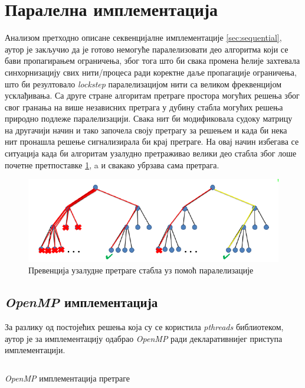 \section{Паралелна имплементација}\label{sec:parallel}

Анализом претходно описане секвенцијалне имплементације \ref{sec:sequential}, аутор је закључио да је готово немогуће паралелизовати део алгоритма који се бави пропагирањем ограничења, због тога што би свака промена ћелије захтевала синхорнизацију свих нити/процеса ради коректне даље пропагације ограничења, што би резултовало \textit{lockstep} паралелизацијом нити са великом фреквенцијом усклађивања. Са друге стране алгоритам претраге простора могућих решења због свог  гранања на више независних претрага у дубину стабла могућих решења природно подлеже паралелизацији. Свака нит би модификовала судоку матрицу на другачији начин и тако започела своју претрагу за решењем и када би нека нит пронашла решење сигнализирала би крај претраге. На овај начин избегава се ситуација када би алгоритам узалудно претраживао велики део стабла због лоше почетне претпоставке \ref{fig:search_parallel}, a и свакако убрзава сама претрага.

\begin{figure}[H]
    \centering
    \includegraphics[width=1\textwidth]{images/search_parallel.png}
    \caption{Превенција узалудне претраге стабла уз помоћ паралелизације}
    \label{fig:search_parallel}
\end{figure}

\subsection{\textit{OpenMP} имплементација}\label{sec:mp_impl}

За разлику од постојећих решења која су се користила \textit{pthreads} \cite{pthreads} библиотеком, аутор је за имплементацију одабрао \textit{OpenMP} \cite{open_mp} ради декларативнијег приступа имплементацији.


\begin{listing}[H]
\inputminted{c}{kodovi/mp_search.c}
\caption{\textit{OpenMP} имплементација претраге}
\label{code:mp_search}
\end{listing}

